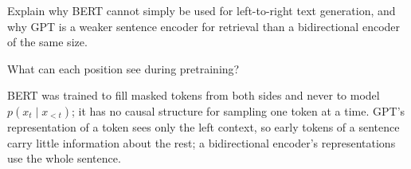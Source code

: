 \begin{problem}\twochili
	Explain why BERT cannot simply be used for left-to-right text generation, and why GPT is a weaker sentence encoder
	for retrieval than a bidirectional encoder of the same size.
	\begin{hint}What can each position see during pretraining?\end{hint}
	\begin{sol}
		BERT was trained to fill masked tokens from both sides and never to model $p(x_t\mid x_{<t})$; it has no causal
		structure for sampling one token at a time. GPT's representation of a token sees only the left context, so early
		tokens of a sentence carry little information about the rest; a bidirectional encoder's representations use the
		whole sentence.
	\end{sol}
\end{problem}
